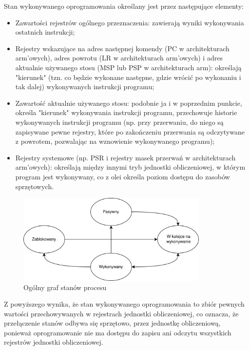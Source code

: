 \documentclass[../main]{subfiles}
\begin{document}
Stan wykonywanego oprogramowania określany jest przez następujące elementy:

\begin{itemize}
    \item Zawartości rejestrów ogólnego przeznaczenia: zawierają wyniki wykonywania ostatnich instrukcji;
    \item Rejestry wskazujące na adres następnej komendy (PC w architekturach \gls{arm}'owych), adres powrotu (LR w architekturach \gls{arm}'owych) i adres aktualnie używanego stosu (MSP lub PSP w architekturach \gls{arm}): określają "kierunek" (tzn. co będzie wykonane następne, gdzie wrócić po wykonaniu i tak dalej) wykonywanych instrukcji programu;
    \item Zawartość aktualnie używanego stosu: podobnie ja i w poprzednim punkcie, określa "kierunek" wykonywania instrukcji programu, przechowuje historie wykonywanych instrukcji programu (np. przy przerwaniu, do niego są zapisywane pewne rejestry, które po zakończeniu przerwania są odczytywane z powrotem, pozwalając na wznowienie wykonywanego programu);
    \item Rejestry systemowe (np. PSR i rejestry masek przerwań w architekturach \gls{arm}'owych): określają między innymi tryb jednostki obliczeniowej, w którym program jest wykonywany, co z olei określa poziom dostępu do zasobów sprzętowych. 
\end{itemize}

\begin{figure}[ht]
    \centering
    \includegraphics[width=0.85\textwidth]{Images/process-states.png}
    \caption{Ogólny graf stanów procesu}
    \label{fig:process-states}
\end{figure}

Z powyższego wynika, że stan wykonywanego oprogramowania to zbiór pewnych wartości przechowywanych w rejestrach jednostki obliczeniowej, co oznacza, że przełączenie stanów odbywa się sprzętowo, przez jednostkę obliczeniową, ponieważ oprogramowanie nie ma dostępu do zapisu ani odczytu wszystkich rejestrów jednostki obliczeniowej.
\end{document}
